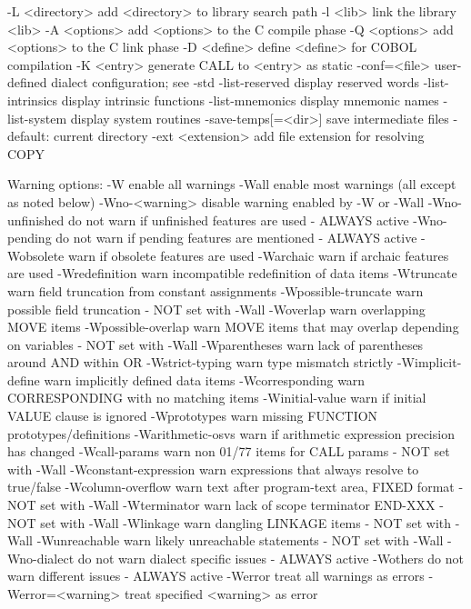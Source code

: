   -L <directory>        add <directory> to library search path
  -l <lib>              link the library <lib>
  -A <options>          add <options> to the C compile phase
  -Q <options>          add <options> to the C link phase
  -D <define>           define <define> for COBOL compilation
  -K <entry>            generate CALL to <entry> as static
  -conf=<file>          user-defined dialect configuration; see -std
  -list-reserved        display reserved words
  -list-intrinsics      display intrinsic functions
  -list-mnemonics       display mnemonic names
  -list-system          display system routines
  -save-temps[=<dir>]   save intermediate files
                        - default: current directory
  -ext <extension>      add file extension for resolving COPY

Warning options:
  -W                    enable all warnings
  -Wall                 enable most warnings (all except as noted below)
  -Wno-<warning>        disable warning enabled by -W or -Wall
  -Wno-unfinished       do not warn if unfinished features are used
                        - ALWAYS active
  -Wno-pending          do not warn if pending features are mentioned
                        - ALWAYS active
  -Wobsolete            warn if obsolete features are used
  -Warchaic             warn if archaic features are used
  -Wredefinition        warn incompatible redefinition of data items
  -Wtruncate            warn field truncation from constant assignments
  -Wpossible-truncate   warn possible field truncation
                        - NOT set with -Wall
  -Woverlap             warn overlapping MOVE items
  -Wpossible-overlap    warn MOVE items that may overlap depending on variables
                        - NOT set with -Wall
  -Wparentheses         warn lack of parentheses around AND within OR
  -Wstrict-typing       warn type mismatch strictly
  -Wimplicit-define     warn implicitly defined data items
  -Wcorresponding       warn CORRESPONDING with no matching items
  -Winitial-value       warn if initial VALUE clause is ignored
  -Wprototypes          warn missing FUNCTION prototypes/definitions
  -Warithmetic-osvs     warn if arithmetic expression precision has changed
  -Wcall-params         warn non 01/77 items for CALL params
                        - NOT set with -Wall
  -Wconstant-expression  warn expressions that always resolve to true/false
  -Wcolumn-overflow     warn text after program-text area, FIXED format
                        - NOT set with -Wall
  -Wterminator          warn lack of scope terminator END-XXX
                        - NOT set with -Wall
  -Wlinkage             warn dangling LINKAGE items
                        - NOT set with -Wall
  -Wunreachable         warn likely unreachable statements
                        - NOT set with -Wall
  -Wno-dialect          do not warn dialect specific issues
                        - ALWAYS active
  -Wothers              do not warn different issues
                        - ALWAYS active
  -Werror               treat all warnings as errors
  -Werror=<warning>     treat specified <warning> as error

